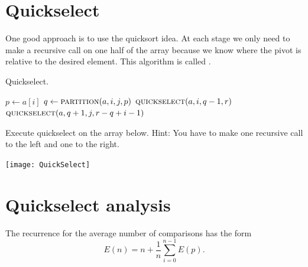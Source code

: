 \section{Quickselect}
One good approach is to use the quicksort idea. At each stage we only need to 
make a recursive call on one half of the array because we know where the pivot 
is relative to the desired element. This algorithm is called .

\begin{algorithm}[H]
  \caption{Quickselect.}
  \label{alg:quickselect}
\begin{algorithmic}[0]
		\State $p \gets a[i]$ 
		\State $q \gets \Call{partition}{a, i,j,p}$ 
			\State {}
			\State $\Call{quickselect}{a,i,q-1,r}$ 
		\Else{}
			\State $\Call{quickselect}{a,q+1,j,r-q+i-1}$ 
		\EndIf
	\EndIf
\EndFunction  
\end{algorithmic}
\end{algorithm}

\begin{Boxample}[1]
Execute quickselect on the array below. Hint: You have to make one recursive call to the left and one to the right.
\begin{center}
\texttt{[image: QuickSelect]} 
\end{center}
\end{Boxample}


\section{Quickselect analysis}
The recurrence for the average number of comparisons has the form 
$$E(n) = n + \frac{1}{n} \sum_{i=0}^{n-1} E(p)\text{.}$$

